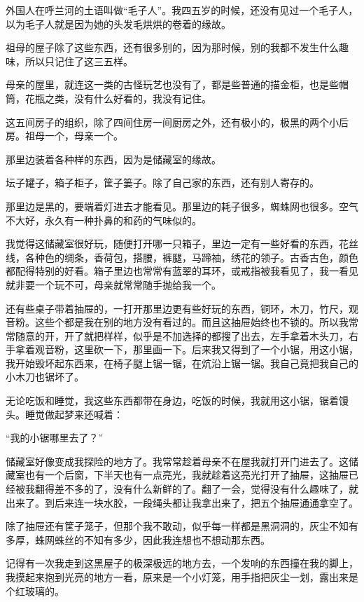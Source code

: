 \par 外国人在呼兰河的土语叫做“毛子人”。我四五岁的时候，还没有见过一个毛子人，以为毛子人就是因为她的头发毛烘烘的卷着的缘故。
\par 祖母的屋子除了这些东西，还有很多别的，因为那时候，别的我都不发生什么趣味，所以只记住了这三五样。
\par 母亲的屋里，就连这一类的古怪玩艺也没有了，都是些普通的描金柜，也是些帽筒，花瓶之类，没有什么好看的，我没有记住。
\par 这五间房子的组织，除了四间住房一间厨房之外，还有极小的，极黑的两个小后房。祖母一个，母亲一个。
\par 那里边装着各种样的东西，因为是储藏室的缘故。
\par 坛子罐子，箱子柜子，筐子篓子。除了自己家的东西，还有别人寄存的。
\par 那里边是黑的，要端着灯进去才能看见。那里边的耗子很多，蜘蛛网也很多。空气不大好，永久有一种扑鼻的和药的气味似的。
\par 我觉得这储藏室很好玩，随便打开哪一只箱子，里边一定有一些好看的东西，花丝线，各种色的绸条，香荷包，搭腰，裤腿，马蹄袖，绣花的领子。古香古色，颜色都配得特别的好看。箱子里边也常常有蓝翠的耳环，或戒指被我看见了，我一看见就非要一个玩不可，母亲就常常随手抛给我一个。
\par 还有些桌子带着抽屉的，一打开那里边更有些好玩的东西，铜环，木刀，竹尺，观音粉。这些个都是我在别的地方没有看过的。而且这抽屉始终也不锁的。所以我常常随意的开，开了就把样样，似乎是不加选择的都搜了出去，左手拿着木头刀，右手拿着观音粉，这里砍一下，那里画一下。后来我又得到了一个小锯，用这小锯，我开始毁坏起东西来，在椅子腿上锯一锯，在炕沿上锯一锯。我自己竟把我自己的小木刀也锯坏了。
\par 无论吃饭和睡觉，我这些东西都带在身边，吃饭的时候，我就用这小锯，锯着馒头。睡觉做起梦来还喊着：
\par “我的小锯哪里去了？”
\par 储藏室好像变成我探险的地方了。我常常趁着母亲不在屋我就打开门进去了。这储藏室也有一个后窗，下半天也有一点亮光，我就趁着这亮光打开了抽屉，这抽屉已经被我翻得差不多的了，没有什么新鲜的了。翻了一会，觉得没有什么趣味了，就出来了。到后来连一块水胶，一段绳头都让我拿出来了，把五个抽屉通通拿空了。
\par 除了抽屉还有筐子笼子，但那个我不敢动，似乎每一样都是黑洞洞的，灰尘不知有多厚，蛛网蛛丝的不知有多少，因此我连想也不想动那东西。
\par 记得有一次我走到这黑屋子的极深极远的地方去，一个发响的东西撞在我的脚上，我摸起来抱到光亮的地方一看，原来是一个小灯笼，用手指把灰尘一划，露出来是个红玻璃的。
